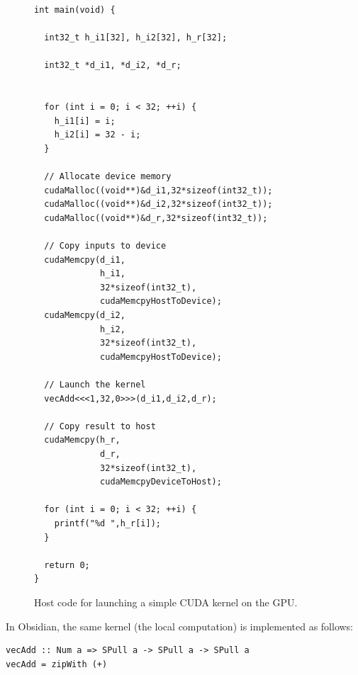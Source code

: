 \documentclass[a4paper]{book}
\begin{document}

\begin{figure} 
\begin{small}
\begin{Verbatim}[samepage=true]
int main(void) {
  
  int32_t h_i1[32], h_i2[32], h_r[32]; 

  int32_t *d_i1, *d_i2, *d_r;

  
  for (int i = 0; i < 32; ++i) { 
    h_i1[i] = i;
    h_i2[i] = 32 - i;
  }

  // Allocate device memory
  cudaMalloc((void**)&d_i1,32*sizeof(int32_t));
  cudaMalloc((void**)&d_i2,32*sizeof(int32_t));
  cudaMalloc((void**)&d_r,32*sizeof(int32_t));
  
  // Copy inputs to device
  cudaMemcpy(d_i1,
             h_i1,
             32*sizeof(int32_t),
             cudaMemcpyHostToDevice);
  cudaMemcpy(d_i2,
             h_i2,
             32*sizeof(int32_t),
             cudaMemcpyHostToDevice);
  
  // Launch the kernel
  vecAdd<<<1,32,0>>>(d_i1,d_i2,d_r); 

  // Copy result to host
  cudaMemcpy(h_r,
             d_r,
             32*sizeof(int32_t),
             cudaMemcpyDeviceToHost);

  for (int i = 0; i < 32; ++i) { 
    printf("%d ",h_r[i]);
  }

  return 0;
}
\end{Verbatim} 
\end{small}

\caption{Host code for launching a simple CUDA kernel on the GPU.}
\label{fig:CUDACODE1}

\end{figure} 

% 

\noindent In Obsidian, the same kernel (the local computation) is implemented as follows: 

\begin{small}
\begin{Verbatim}[samepage=true]
vecAdd :: Num a => SPull a -> SPull a -> SPull a
vecAdd = zipWith (+)
\end{Verbatim}
\end{small}
\end{document}
